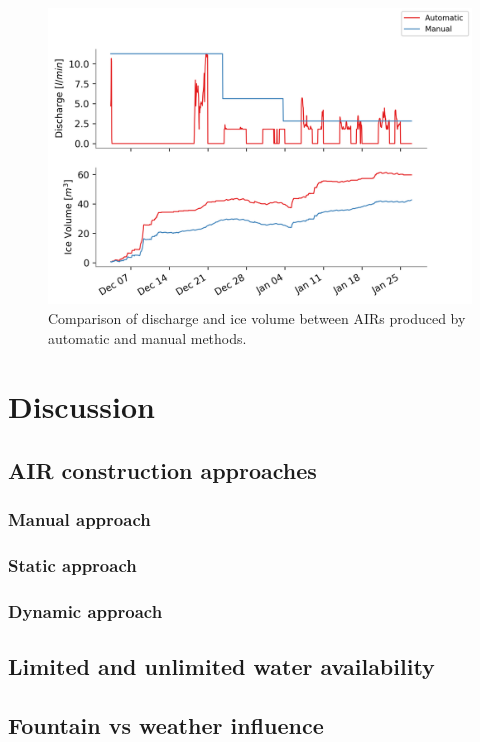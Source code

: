 \documentclass[utf8]{frontiersSCNS}
\begin{document}
\begin{figure}[ht]
	\begin{center}
		\includegraphics[width=\linewidth]{Figures/autovsmanual.png}
	\end{center}
	\caption{Comparison of discharge and ice volume between AIRs produced by automatic and manual methods. }
	\label{fig:old_icestupa}
\end{figure}

\section{Discussion}
\subsection{AIR construction approaches}
\subsubsection{Manual approach}
\subsubsection{Static approach}
\subsubsection{Dynamic approach}

\subsection{Limited and unlimited water availability}

\subsection{Fountain vs weather influence}
\end{document}
